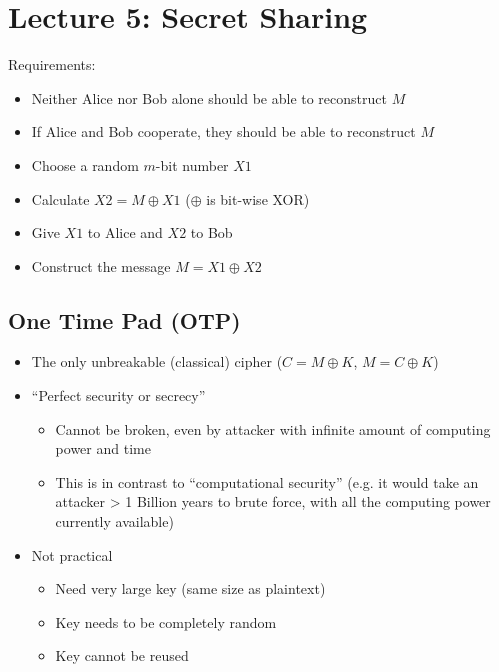 \section{Lecture 5: Secret Sharing}
Requirements:
\begin{itemize}
	\item Neither Alice nor Bob alone should be able to reconstruct $M$
	\item If Alice and Bob cooperate, they should be able to reconstruct $M$
	\item Choose a random $m$-bit number $X1$
	\item Calculate $X2=M\oplus X1$ ($\oplus$ is bit-wise XOR)
	\item Give $X1$ to Alice and $X2$ to Bob
	\item Construct the message $M=X1\oplus X2$
\end{itemize}

\subsection{One Time Pad (OTP)}
\begin{itemize}
	\item The only unbreakable (classical) cipher ($C=M\oplus K$, $M=C\oplus K$)
	\item ``Perfect security or secrecy''
	\begin{itemize}
		\item Cannot be broken, even by attacker with infinite amount of computing power and time
		\item This is in contrast to ``computational security'' (e.g. it would take an attacker > 1 Billion years to brute force, with all the computing power currently available)
	\end{itemize}
	\item Not practical
	\begin{itemize}
		\item Need very large key (same size as plaintext)
		\item Key needs to be completely random
		\item Key cannot be reused
	\end{itemize}
\end{itemize}
